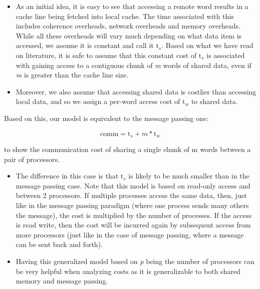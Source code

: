 \documentclass[12pt,twoside, parskip=full]{scrartcl}
\begin{document}
\begin{itemize}
	\item As an initial idea, it is easy to see that accessing a remote word results in a cache line being fetched into local cache. The time associated with this includes coherence overheads, network overheads and memory overheads. While all these overheads will vary much depending on what data item is accessed, we assume it is constant and call it $\text{t}_{s}$. Based on what we have read on literature, it is safe to assume that this constant cost of $\text{t}_{s}$ is associated with gaining access to a contiguous chunk of \textit{m} words of shared data, even if \textit{m} is greater than the cache line size. 
	
	\item Moreover, we also assume that accessing shared data is costlier than accessing local data, and so we assign a per-word access cost of $\text{t}_{w}$ to shared data. 
	
	
\end{itemize}

Based on this, our model is equivalent to the message passing one:

\begin{equation}
\text{comm} = \text{t}_{s} + m * \text{t}_{w}
\end{equation}

to show the communication cost of sharing a single chunk of m words between a pair of processors.

\begin{itemize}
\item The difference in this case is that $\text{t}_{s}$ is likely to be much smaller than in the message passing case. Note that this model is based on read-only access and between 2 processors. If multiple processes access the same data, then, just like in the message passing paradigm (where one process sends many others the message), the cost is multiplied by the number of processes. If the access is read write, then the cost will be incurred again by subsequent access from more processors (just like in the case of message passing, where a message can be sent back and forth). 

\item Having this generalized model based on \textit{p} being the number of processors can be very helpful when analyzing costs as it is generalizable to both shared memory and message passing.   


\end{itemize}
\end{document}
